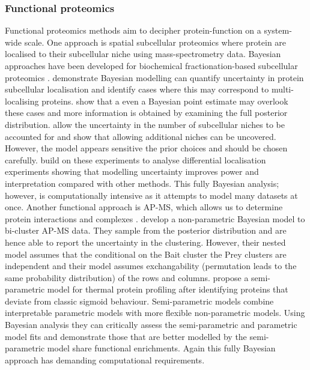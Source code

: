 \documentclass[12pt,english, journal=jpr, layout=twocolumn]{article}
\begin{document}
\subsubsection{Functional proteomics}       
Functional proteomics methods aim to decipher protein-function on a system-wide scale. One approach is spatial subcellular proteomics \citep{Geladaki::2019, Christopher::2021} where protein are localised to their subcellular niche using mass-spectrometry data. Bayesian approaches have been developed for biochemical fractionation-based subcellular proteomics \citep{Crook::2018, Crook::2019, Crook::2019b, Crook::2020, Crook::2021}. \citet{Crook::2018, Crook::2019, Crook::2019b} demonstrate Bayesian modelling can quantify uncertainty in protein subcellular localisation and identify cases where this may correspond to multi-localising proteins. \citet{Crook::2018} show that a even a Bayesian point estimate may overlook these cases and more information is obtained by examining the full posterior distribution. \citet{Crook::2020} allow the uncertainty in the number of subcellular niches to be accounted for and show that allowing additional niches can be uncovered. However, the model appears sensitive the prior choices and should be chosen carefully. \citet{Crook::2021} build on these experiments to analyse differential localisation experiments showing that modelling uncertainty improves power and interpretation compared with other methods. This fully Bayesian analysis; however, is computationally intensive as it attempts to model many datasets at once. Another functional approach is AP-MS, which allows us to determine protein interactions and complexes \citep{Christopher::2021}. \citet{Choi::2010} develop a non-parametric Bayesian model to bi-cluster AP-MS data. They sample from the posterior distribution and are hence able to report the uncertainty in the clustering. However, their nested model assumes that the conditional on the Bait cluster the Prey clusters are independent and their model assumes exchangability (permutation leads to the same probability distribution) of the rows and columns. \citet{Fang::2021} propose a semi-parametric model for thermal protein profiling after identifying proteins that deviate from classic sigmoid behaviour. Semi-parametric models combine interpretable parametric models with more flexible non-parametric models. Using Bayesian analysis they can critically assess the semi-parametric and parametric model fits and demonstrate those that are better modelled by the semi-parametric model share functional enrichments. Again this fully Bayesian approach has demanding computational requirements. 
	
\end{document}
